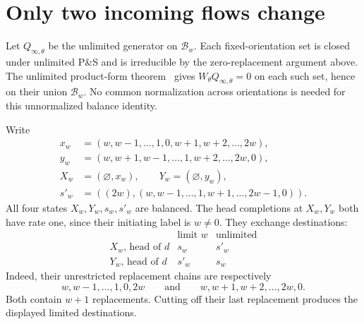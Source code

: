 \documentclass[11pt]{article}
\newcommand{\B}{\mathcal B_w}
\newcommand{\Qi}{Q_{\infty,\theta}}
\newcommand{\W}{W_\theta}
\begin{document}
\newpage
\section{Only two incoming flows change}
Let $\Qi$ be the unlimited generator on $\B$. Each fixed-orientation set is closed under unlimited P\&S and is irreducible by the zero-replacement argument above. The unlimited product-form theorem~\cite[Theorem 3]{DG} gives $\W\Qi=0$ on each such set, hence on their union $\B$. No common normalization across orientations is needed for this unnormalized balance identity.

Write
\begin{align*}
 x_w&=(w,w-1,\ldots,1,0,w+1,w+2,\ldots,2w),\\
 y_w&=(w,w+1,w-1,\ldots,1,w+2,\ldots,2w,0),\\
 X_w&=(\varnothing,x_w),\qquad Y_w=(\varnothing,y_w),\\
 s'_w&=((2w),(w,w-1,\ldots,1,w+1,\ldots,2w-1,0)).
\end{align*}
All four states $X_w,Y_w,s_w,s'_w$ are balanced. The head completions at $X_w,Y_w$ both have rate one, since their initiating label is $w\ne0$. They exchange destinations:
\[
\begin{array}{c|cc}
 &\text{limit }w&\text{unlimited}\\ \hline
 X_w\text{, head of }d&s_w&s'_w\\
 Y_w\text{, head of }d&s'_w&s_w
\end{array}
\]
Indeed, their unrestricted replacement chains are respectively
\[
 w,w-1,\ldots,1,0,2w\qquad\text{and}\qquad
 w,w+1,w+2,\ldots,2w,0.
\]
Both contain $w+1$ replacements. Cutting off their last replacement produces the displayed limited destinations.
\end{document}
